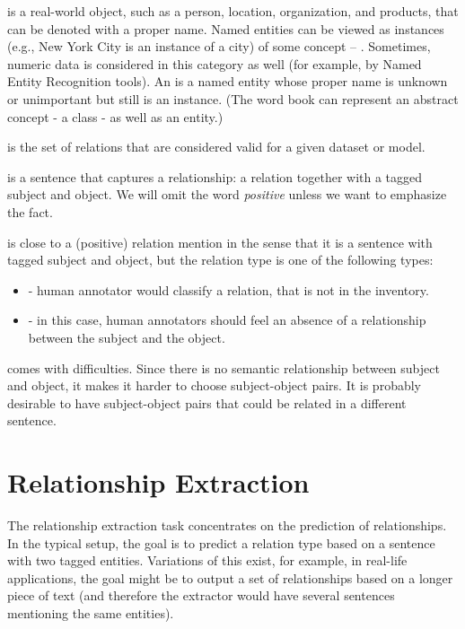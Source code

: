  is a real-world object, such as a person, location, organization, and products, that can be denoted with a proper name. Named entities can be viewed as instances (e.g., New York City is an instance of a city) of some concept -- . Sometimes, numeric data is considered in this category as well (for example, by Named Entity Recognition tools). An  is a named entity whose proper name is unknown or unimportant but still is an instance. (The word book can represent an abstract concept - a class - as well as an entity.) 

 is the set of relations that are considered valid for a given dataset or model.

 is a sentence that captures a relationship: a relation together with a tagged subject and object. We will omit the word \textit{positive} unless we want to emphasize the fact.

 is close to a (positive) relation mention in the sense that it is a sentence with tagged subject and object, but the relation type is one of the following types: 
\begin{itemize}
\item {} - human annotator would classify a relation, that is not in the inventory.
\item {} - in this case, human annotators should feel an absence of a relationship between the subject and the object. 

\end{itemize}

 comes with difficulties. Since there is no semantic relationship between subject and object, it makes it harder to choose subject-object pairs. It is probably desirable to have subject-object pairs that could be related in a different sentence.


\section{Relationship Extraction}
The relationship extraction task concentrates on the prediction of relationships. In the typical setup, the goal is to predict a relation type based on a sentence with two tagged entities. Variations of this exist, for example, in real-life applications, the goal might be to output a set of relationships based on a longer piece of text (and therefore the extractor would have several sentences mentioning the same entities). 

